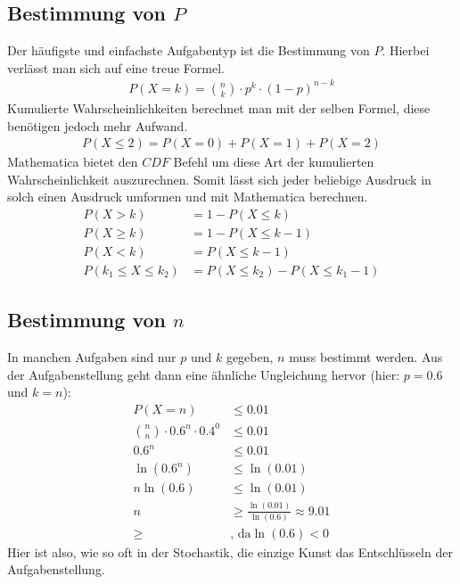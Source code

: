 \subsection{Bestimmung von $P$}
\begin{flushleft}
    Der häufigste und einfachste Aufgabentyp ist die Bestimmung von $P$.
    Hierbei verlässt man sich auf eine treue Formel.
    \begin{align}
        P(X=k)=\binom{n}{k} \cdot p^k \cdot (1-p)^{n-k}
    \end{align}
    Kumulierte Wahrscheinlichkeiten berechnet man mit der selben Formel, diese benötigen
    jedoch mehr Aufwand.
    \begin{align}
        P(X \leq 2)=P(X=0)+P(X=1)+P(X=2)
    \end{align}
    Mathematica bietet den $CDF$ Befehl um diese Art der kumulierten Wahrscheinlichkeit auszurechnen.
    Somit lässt sich jeder beliebige Ausdruck in solch einen Ausdruck umformen und mit Mathematica berechnen.
    \begin{align}
        P(X>k) &= 1-P(X \leq k) \\
        P(X \geq k) &= 1-P(X \leq k-1) \\
        P(X<k) &= P(X \leq k-1) \\
        P(k_{1} \leq X \leq k_{2}) &= P(X \leq k_{2})-P(X \leq k_{1}-1)
    \end{align}
\end{flushleft}

\subsection{Bestimmung von $n$}
\begin{flushleft}
    In manchen Aufgaben sind nur $p$ und $k$ gegeben, $n$ muss bestimmt werden.
    Aus der Aufgabenstellung geht dann eine ähnliche Ungleichung hervor (hier: $p=0.6$ und $k=n$):
    \begin{align}
        P(X=n) &\leq 0.01 \\
        \binom{n}{n} \cdot 0.6^n \cdot 0.4^0 &\leq 0.01 \\
        0.6^n &\leq 0.01 \\
        \ln(0.6^n) &\leq \ln(0.01) \\
        n\ln(0.6) &\leq \ln(0.01) \\
        n &\geq \frac{\ln(0.01)}{\ln(0.6)} \approx 9.01 \\
        \geq &\text{, da} \ln(0.6)<0
    \end{align}
    Hier ist also, wie so oft in der Stochastik, die einzige Kunst das Entschlüsseln der Aufgabenstellung.
\end{flushleft}

